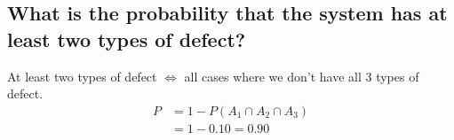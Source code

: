 \subsection{What is the probability that the system has at least two types of defect?}
At least two types of defect \(\Leftrightarrow\) all cases where we don't have all 3 types of defect.
\begin{equation}
    \begin{split}
        P & = 1 - P(A_1 \cap A_2 \cap A_3) \\
          & = 1 - 0.10 = 0.90
    \end{split}
\end{equation}